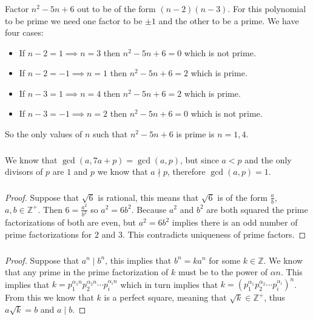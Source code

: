 \documentclass[class=article, crop=false]{standalone}
\def\integers{{\mathbb Z}}
\begin{document}
\subsubsection{}
Factor $n^2-5n+6$ out to be of the form $(n-2)(n-3)$. For this polynomial to be prime
	we need one factor to be $\pm1$ and the other to be a prime. We have four cases:
	\begin{itemize}
		\item If $n-2=1\implies n=3$ then $n^2-5n+6=0$ which is not prime.
		\item If $n-2=-1\implies n=1$ then $n^2-5n+6=2$ which is prime.
		\item If $n-3=1\implies n=4$ then $n^2-5n+6=2$ which is prime.
		\item If $n-3=-1\implies n=2$ then $n^2-5n+6=0$ which is not prime.
	\end{itemize}
	So the only values of $n$ such that $n^2-5n+6$ is prime is $n=1,4$.

\subsubsection{}
We know that $\gcd(a,7a+p)=\gcd(a,p)$, but since $a<p$ and the only divisors of $p$ are $1$ and
$p$ we know that $a\nmid p$, therefore $\gcd(a,p)=1$.

\subsubsection{}
\begin{proof}
	Suppose that $\sqrt{6}$ is rational, this means that $\sqrt{6}$ is of the form $\frac{a}{b}$, $a,b\in\integers^+$.
	Then $6=\frac{a^2}{b^2}$ so $a^2=6b^2$. Because $a^2$ and $b^2$ are both squared the prime factorizations
	of both are even, but $a^2=6b^2$ implies there is an odd number of prime factorizations for $2$ and $3$. This contradicts
	uniqueness of prime factors.
\end{proof}

\subsubsection{}
\begin{proof}
	Suppose that $a^n\mid b^n$, this implies that $b^n = ka^n$ for some $k\in\integers$.
	We know that any prime in the prime factorization of $k$ must be to the power of $\alpha n$.
	This implies that $k=p_1^{\alpha_1 n} p_2^{\alpha_2 n} \cdots p_i^{\alpha_i n}$ which in turn
	implies that $k=(p_1^{\alpha_1} p_2^{\alpha_2}\cdots p_i^{\alpha_i})^n$. From this we know that 
	$k$ is a perfect square, meaning that $\sqrt{k}\in\integers^+$, thus $a\sqrt{k}=b$ and
	$a\mid b$.
\end{proof}
\end{document}
